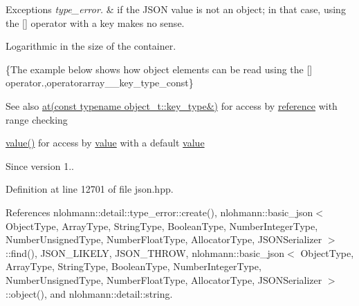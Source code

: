 \begin{DoxyExceptions}{Exceptions}
{\em type\+\_\+error.} & if the J\+S\+ON value is not an object; in that case, using the \mbox{[}\mbox{]} operator with a key makes no sense.\\
\hline
\end{DoxyExceptions}
Logarithmic in the size of the container.

\{The example below shows how object elements can be read using the {\ttfamily \mbox{[}\mbox{]}} operator.,operatorarray\+\_\+\+\_\+key\+\_\+type\+\_\+const\}

\begin{DoxySeeAlso}{See also}
\hyperlink{classnlohmann_1_1basic__json_a93403e803947b86f4da2d1fb3345cf2c}{at(const typename object\+\_\+t\+::key\+\_\+type\&)} for access by \hyperlink{classnlohmann_1_1basic__json_ac6a5eddd156c776ac75ff54cfe54a5bc}{reference} with range checking 

\hyperlink{classnlohmann_1_1basic__json_adcf8ca5079f5db993820bf50036bf45d}{value()} for access by \hyperlink{classnlohmann_1_1basic__json_adcf8ca5079f5db993820bf50036bf45d}{value} with a default \hyperlink{classnlohmann_1_1basic__json_adcf8ca5079f5db993820bf50036bf45d}{value}
\end{DoxySeeAlso}
\begin{DoxySince}{Since}
version 1.. 
\end{DoxySince}


Definition at line 12701 of file json.\+hpp.



References nlohmann\+::detail\+::type\+\_\+error\+::create(), nlohmann\+::basic\+\_\+json$<$ Object\+Type, Array\+Type, String\+Type, Boolean\+Type, Number\+Integer\+Type, Number\+Unsigned\+Type, Number\+Float\+Type, Allocator\+Type, J\+S\+O\+N\+Serializer $>$\+::find(), J\+S\+O\+N\+\_\+\+L\+I\+K\+E\+LY, J\+S\+O\+N\+\_\+\+T\+H\+R\+OW, nlohmann\+::basic\+\_\+json$<$ Object\+Type, Array\+Type, String\+Type, Boolean\+Type, Number\+Integer\+Type, Number\+Unsigned\+Type, Number\+Float\+Type, Allocator\+Type, J\+S\+O\+N\+Serializer $>$\+::object(), and nlohmann\+::detail\+::string.


